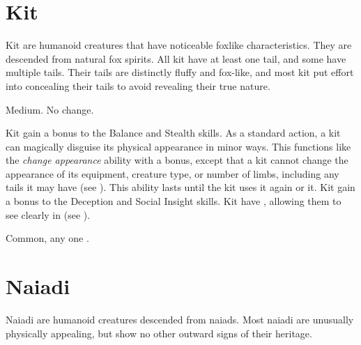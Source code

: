 \section{Kit}

  Kit are humanoid creatures that have noticeable foxlike characteristics.
  They are descended from natural fox spirits.
  All kit have at least one tail, and some have multiple tails.
  Their tails are distinctly fluffy and fox-like, and most kit put effort into concealing their tails to avoid revealing their true nature.

   Medium.
   No change.
  \begin{itemize}
     Kit gain a  bonus to the Balance and Stealth skills.
     As a standard action, a kit can magically disguise its physical appearance in minor ways.
      This functions like the \textit{change appearance} ability with a  bonus, except that a kit cannot change the appearance of its equipment, creature type, or number of limbs, including any tails it may have (see ).
      This ability lasts until the kit uses it again or  it.
     Kit gain a  bonus to the Deception and Social Insight skills.
     Kit have , allowing them to see clearly in  (see ).
  \end{itemize}
   Common, any one .

\section{Naiadi}
  Naiadi are humanoid creatures descended from naiads.
  Most naiadi are unusually physically appealing, but show no other outward signs of their heritage.

